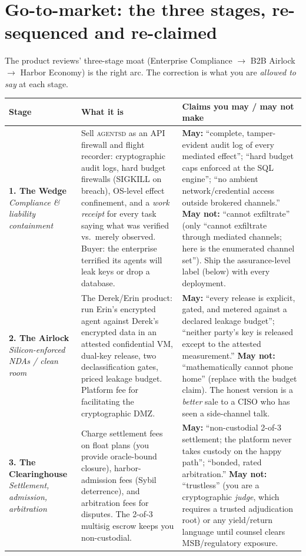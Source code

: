 \documentclass[11pt,a4paper]{article}
\begin{document}
\section{Go-to-market: the three stages, re-sequenced and re-claimed}
The product reviews' three-stage moat (Enterprise Compliance $\to$ B2B Airlock $\to$ Harbor Economy) is the right arc. The correction is what you are \emph{allowed to say} at each stage.

\begin{longtable}{@{}p{}p{}p{}@{}}
\toprule
\textbf{Stage} & \textbf{What it is} & \textbf{Claims you may / may not make} \\
\midrule
\endhead
\textbf{1. The Wedge} \newline \emph{Compliance \& liability containment} & Sell \textsc{agentsd} as an API firewall and flight recorder: cryptographic audit logs, hard budget firewalls (SIGKILL on breach), OS-level effect confinement, and a \emph{work receipt} for every task saying what was verified vs.\ merely observed. Buyer: the enterprise terrified its agents will leak keys or drop a database. & \textbf{May:} ``complete, tamper-evident audit log of every mediated effect''; ``hard budget caps enforced at the SQL engine''; ``no ambient network/credential access outside brokered channels.'' \textbf{May not:} ``cannot exfiltrate'' (only ``cannot exfiltrate through mediated channels; here is the enumerated channel set''). Ship the assurance-level label (below) with every deployment. \\
\addlinespace
\textbf{2. The Airlock} \newline \emph{Silicon-enforced NDAs / clean room} & The Derek/Erin product: run Erin's encrypted agent against Derek's encrypted data in an attested confidential VM, dual-key release, two declassification gates, priced leakage budget. Platform fee for facilitating the cryptographic DMZ. & \textbf{May:} ``every release is explicit, gated, and metered against a declared leakage budget''; ``neither party's key is released except to the attested measurement.'' \textbf{May not:} ``mathematically cannot phone home'' (replace with the budget claim). The honest version is a \emph{better} sale to a CISO who has seen a side-channel talk. \\
\addlinespace
\textbf{3. The Clearinghouse} \newline \emph{Settlement, admission, arbitration} & Charge settlement fees on float plans (you provide oracle-bound closure), harbor-admission fees (Sybil deterrence), and arbitration fees for disputes. The 2-of-3 multisig escrow keeps you non-custodial. & \textbf{May:} ``non-custodial 2-of-3 settlement; the platform never takes custody on the happy path''; ``bonded, rated arbitration.'' \textbf{May not:} ``trustless'' (you are a cryptographic \emph{judge}, which requires a trusted adjudication root) or any yield/return language until counsel clears MSB/regulatory exposure. \\
\bottomrule
\end{longtable}
\end{document}
